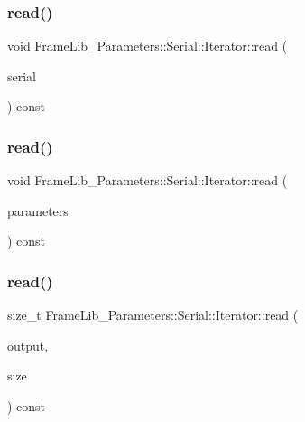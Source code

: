 \subsubsection{\texorpdfstring{read()}{read()}\hspace{0.1cm}{\footnotesize\ttfamily [1/3]}}
{\footnotesize\ttfamily void Frame\+Lib\+\_\+\+Parameters\+::\+Serial\+::\+Iterator\+::read (\begin{DoxyParamCaption}\item[{\hyperlink{class_frame_lib___parameters_1_1_serial}{Serial} $\ast$}]{serial }\end{DoxyParamCaption}) const}

\mbox{\label{class_frame_lib___parameters_1_1_serial_1_1_iterator_afccdc2c5875c7dcbbedde988991e137f}} 
\subsubsection{\texorpdfstring{read()}{read()}\hspace{0.1cm}{\footnotesize\ttfamily [2/3]}}
{\footnotesize\ttfamily void Frame\+Lib\+\_\+\+Parameters\+::\+Serial\+::\+Iterator\+::read (\begin{DoxyParamCaption}\item[{\hyperlink{class_frame_lib___parameters}{Frame\+Lib\+\_\+\+Parameters} $\ast$}]{parameters }\end{DoxyParamCaption}) const}

\mbox{\label{class_frame_lib___parameters_1_1_serial_1_1_iterator_adda0cb1e1555363505f462eca7a3b9b1}} 
\subsubsection{\texorpdfstring{read()}{read()}\hspace{0.1cm}{\footnotesize\ttfamily [3/3]}}
{\footnotesize\ttfamily size\+\_\+t Frame\+Lib\+\_\+\+Parameters\+::\+Serial\+::\+Iterator\+::read (\begin{DoxyParamCaption}\item[{double $\ast$}]{output,  }\item[{unsigned long}]{size }\end{DoxyParamCaption}) const}



